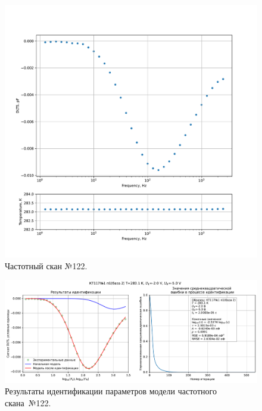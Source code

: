 \begin{figure}[!ht]
    \centering
    \includegraphics[width=1\textwidth]{../plots/КТ117№1_п1(база 2)_2500Гц-1Гц_1пФ_+10С_-2В-5В_200мВ_20мкс_шаг_0,1.pdf}
    \caption{Частотный скан №122.}
    \label{pic:frequency_scan_122}
\end{figure}

\begin{figure}[!ht]
    \centering
    \includegraphics[width=1\textwidth]{../plots/КТ117№1_п1(база 2)_2500Гц-1Гц_1пФ_+10С_-2В-5В_200мВ_20мкс_шаг_0,1_model.pdf}
    \caption{Результаты идентификации параметров модели частотного скана~№122.}
    \label{pic:frequency_scan_model122}
\end{figure}

\pagebreak


